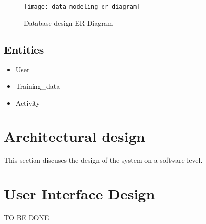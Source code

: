     \begin{figure}[ht]
        \centering
        \texttt{[image: data\_modeling\_er\_diagram]}
        \caption{Database design ER Diagram}
        \label{fig:data_modeling_er_diagram}
    \end{figure}
    
        \subsection*{Entities}
            \begin{itemize}
                \item User
                \item {Training\_data}
                \item {Activity}
            \end{itemize}
    
    
    \section{Architectural design}
    This section discuses the design of the system on a software level.
    
        
    \section{User Interface Design}
    TO BE DONE